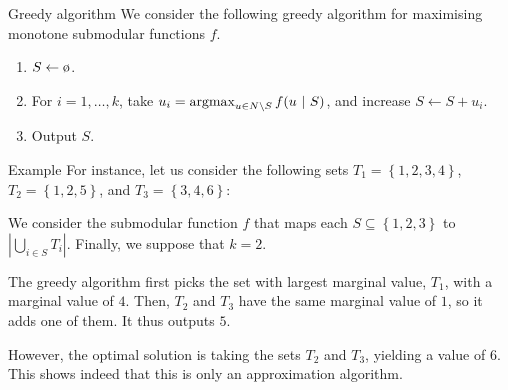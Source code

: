 \documentclass[a4paper]{article}
\begin{document}
\begin{parag}{Greedy algorithm}
    We consider the following greedy algorithm for maximising monotone submodular functions $f$.
    \begin{enumerate}
        \item $S \leftarrow \o$.
        \item For $i = 1, \ldots, k$, take $u_i = \argmax_{u \in N \setminus S} f\left(u \suchthat S\right)$, and increase $S \leftarrow S + u_i$.
        \item Output $S$.
    \end{enumerate}
    
    \begin{subparag}{Example}
        For instance, let us consider the following sets $T_1 = \left\{1, 2, 3, 4\right\}$, $T_2 = \left\{1, 2, 5\right\}$, and $T_3 = \left\{3, 4, 6\right\}$:

        We consider the submodular function $f$ that maps each $S \subseteq \left\{1, 2, 3\right\}$ to $\left|\bigcup_{i \in S} T_i\right|$. Finally, we suppose that $k = 2$.

        The greedy algorithm first picks the set with largest marginal value, $T_1$, with a marginal value of $4$. Then, $T_2$ and $T_3$ have the same marginal value of $1$, so it adds one of them. It thus outputs $5$.

        However, the optimal solution is taking the sets $T_2$ and $T_3$, yielding a value of $6$. This shows indeed that this is only an approximation algorithm.
    \end{subparag}
\end{parag}
\end{document}
